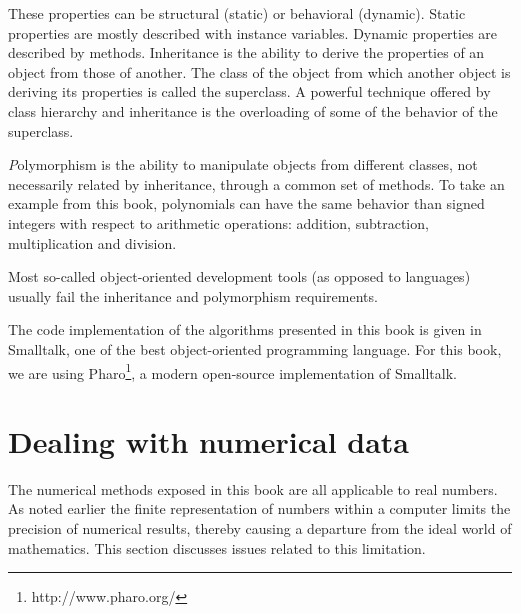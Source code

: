 These properties can be structural (static) or behavioral
(dynamic). Static properties are mostly described with instance
variables. Dynamic properties are described by methods.
Inheritance is the ability to derive the properties of an object
from those of another. The class of the object from which another
object is deriving its properties is called the superclass. A
powerful technique offered by class hierarchy and inheritance is
the overloading of some of the behavior of the superclass.
\par
{\textit Polymorphism} is the ability to manipulate objects from
different classes, not necessarily related by inheritance, through
a common set of methods. To take an example from this book,
polynomials can have the same behavior than signed integers with
respect to arithmetic operations: addition, subtraction,
multiplication and division.
\par
Most so-called object-oriented development tools (as opposed to
languages) usually fail the inheritance and polymorphism
requirements.
\par
The code implementation of the algorithms presented in this book
is given in Smalltalk, one of the best object-oriented programming language.
For this book, we are using Pharo\footnote{http://www.pharo.org/}, a modern
open-source implementation of Smalltalk.


\section{Dealing with numerical data}
The numerical methods exposed in this book are all applicable to
real numbers. As noted earlier the finite representation of
numbers within a computer limits the precision of numerical
results, thereby causing a departure from the ideal world of
mathematics. This section discusses issues related to this
limitation.

